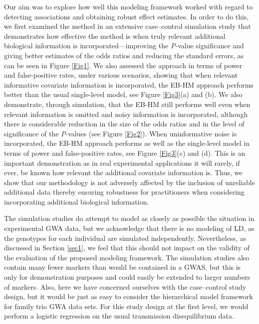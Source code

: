 Our aim was to explore how well this modeling framework worked
with regard to detecting associations and obtaining robust
effect estimates. In order to do this, we first examined the
method in an extensive case--control simulation study that
demonstrates how effective the method is when truly relevant
additional biological information is incorporated---improving
the \textit{P}-value significance and giving better estimates
of the odds ratios and reducing the standard errors, as can
be seen in Figure \ref{Fig1}. We also assessed the approach
in terms of power and false-positive rates, under various
scenarios, showing that when relevant informative covariate
information is incorporated, the EB-HM approach performs
better than the usual single-level model, see
Figure \ref{Fig3}(a) and (b). We also demonstrate, through
simulation, that the EB-HM still performs well even when
relevant information is omitted and noisy information is
incorporated, although there is considerable reduction in
the size of the odds ratios and in the level of significance
of the \textit{P}-values (see Figure \ref{Fig2}). When
uninformative noise is incorporated, the EB-HM approach
performs as well as the single-level model in terms of power
and false-positive rates, see Figure \ref{Fig3}(c) and (d).
This is an important demonstration as in real experimental
applications it will rarely, if ever, be known how relevant
the additional covariate information is. Thus, we show that
our methodology is not adversely affected by the inclusion of
unreliable additional data thereby ensuring robustness for
practitioners when considering incorporating additional
biological information.

The simulation studies do attempt to model as closely as
possible the situation in experimental GWA data, but we
acknowledge that there is no modeling of LD, as the genotypes
for each individual are simulated independently. Nevertheless,
as discussed in Section \ref{sec1}, we feel that this should
not impact on the validity of the evaluation of the proposed
modeling framework. The simulation studies also contain many
fewer markers than would be contained in a GWAS, but this
is only for demonstration purposes and could easily be
extended to larger numbers of markers. Also, here we have
concerned ourselves with the case--control study design,
but it would be just as easy to consider the hierarchical
model framework for family trio GWA data sets. For this
study design at the first level, we would perform a
logistic regression on the usual transmission
disequilibrium data.

